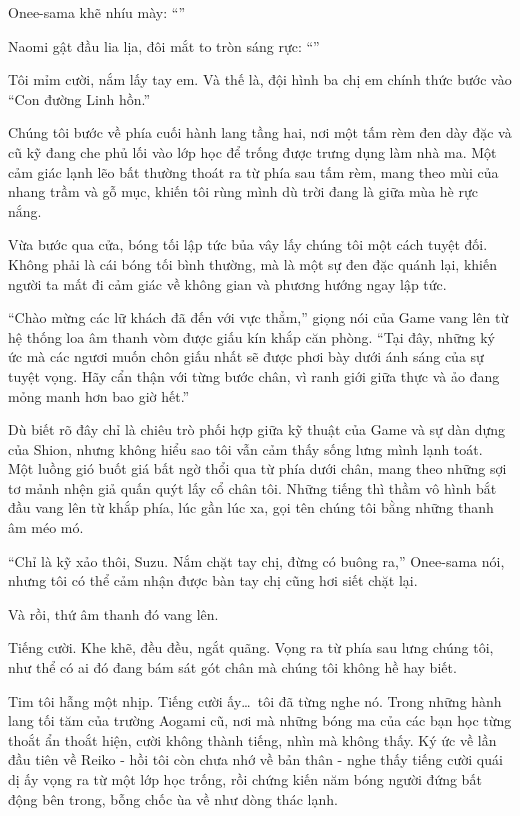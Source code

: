 \documentclass[../main.tex]{subfiles}
\begin{document}
Onee-sama khẽ nhíu mày: ``''

Naomi gật đầu lia lịa, đôi mắt to tròn sáng rực: ``''

Tôi mỉm cười, nắm lấy tay em. Và thế là, đội hình ba chị em chính thức bước vào ``Con đường Linh hồn.''

Chúng tôi bước về phía cuối hành lang tầng hai, nơi một tấm rèm đen dày đặc và cũ kỹ đang che phủ lối vào lớp học để trống được trưng dụng làm nhà ma. Một cảm giác lạnh lẽo bất thường thoát ra từ phía sau tấm rèm, mang theo mùi của nhang trầm và gỗ mục, khiến tôi rùng mình dù trời đang là giữa mùa hè rực nắng.

Vừa bước qua cửa, bóng tối lập tức bủa vây lấy chúng tôi một cách tuyệt đối. Không phải là cái bóng tối bình thường, mà là một sự đen đặc quánh lại, khiến người ta mất đi cảm giác về không gian và phương hướng ngay lập tức.

``Chào mừng các lữ khách đã đến với vực thẳm,'' giọng nói của Game vang lên từ hệ thống loa âm thanh vòm được giấu kín khắp căn phòng. ``Tại đây, những ký ức mà các ngươi muốn chôn giấu nhất sẽ được phơi bày dưới ánh sáng của sự tuyệt vọng. Hãy cẩn thận với từng bước chân, vì ranh giới giữa thực và ảo đang mỏng manh hơn bao giờ hết.''

Dù biết rõ đây chỉ là chiêu trò phối hợp giữa kỹ thuật của Game và sự dàn dựng của Shion, nhưng không hiểu sao tôi vẫn cảm thấy sống lưng mình lạnh toát. Một luồng gió buốt giá bất ngờ thổi qua từ phía dưới chân, mang theo những sợi tơ mảnh nhện giả quấn quýt lấy cổ chân tôi. Những tiếng thì thầm vô hình bắt đầu vang lên từ khắp phía, lúc gần lúc xa, gọi tên chúng tôi bằng những thanh âm méo mó.

``Chỉ là kỹ xảo thôi, Suzu. Nắm chặt tay chị, đừng có buông ra,'' Onee-sama nói, nhưng tôi có thể cảm nhận được bàn tay chị cũng hơi siết chặt lại.

Và rồi, thứ âm thanh đó vang lên.

Tiếng cười. Khe khẽ, đều đều, ngắt quãng. Vọng ra từ phía sau lưng chúng tôi, như thể có ai đó đang bám sát gót chân mà chúng tôi không hề hay biết.

Tim tôi hẫng một nhịp. Tiếng cười ấy\dots\ tôi đã từng nghe nó. Trong những hành lang tối tăm của trường Aogami cũ, nơi mà những bóng ma của các bạn học từng thoắt ẩn thoắt hiện, cười không thành tiếng, nhìn mà không thấy. Ký ức về lần đầu tiên về Reiko - hồi tôi còn chưa nhớ về bản thân - nghe thấy tiếng cười quái dị ấy vọng ra từ một lớp học trống, rồi chứng kiến năm bóng người đứng bất động bên trong, bỗng chốc ùa về như dòng thác lạnh.
\end{document}
